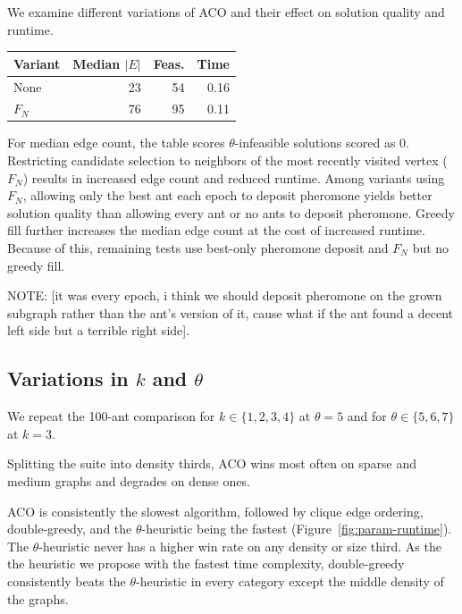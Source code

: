 \documentclass[conference]{IEEEtran}
\begin{document}
We examine different variations of ACO and their effect on solution quality and runtime.

\begin{center}
 \footnotesize
 \setlength{\tabcolsep}{4pt}
 \begin{tabular}{@{}lrrr@{}}
     \toprule
     Variant & Median $|E|$ & Feas. & Time \\
     \midrule
     None & 23 & 54 & 0.16 \\
     $F_N$ & 76 & 95 & 0.11 \\
     \midrule
     \bottomrule
 \end{tabular}
\end{center}

For median edge count, the table scores $\theta$-infeasible solutions scored as $0$. Restricting candidate selection to neighbors of the most recently visited vertex ($F_N$) results in increased edge count and reduced runtime. Among variants using $F_N$, allowing only the best ant each epoch to deposit pheromone yields better solution quality than allowing every ant or no ants to deposit pheromone. Greedy fill further increases the median edge count at the cost of increased runtime. Because of this, remaining tests use best-only pheromone deposit and $F_N$ but no greedy fill.

NOTE: [it was every epoch, i think we should deposit pheromone on the grown subgraph rather than the ant's version of it, cause what if the ant found a decent left side but a terrible right side].

\subsection{Variations in \texorpdfstring{$k$}{k} and \texorpdfstring{$\theta$}{θ}}

We repeat the 100-ant comparison for $k \in \{1,2,3,4\}$ at $\theta = 5$ and for $\theta \in \{5,6,7\}$ at $k = 3$.


Splitting the suite into density thirds, ACO wins most often on sparse and medium graphs and degrades on dense ones.


ACO is consistently the slowest algorithm, followed by clique edge ordering, double-greedy, and the $\theta$-heuristic being the fastest (Figure~\ref{fig:param-runtime}). The $\theta$-heuristic never has a higher win rate on any density or size third. As the the heuristic we propose with the fastest time complexity, double-greedy consistently beats the $\theta$-heuristic in every category except the middle density of the graphs.
\end{document}
